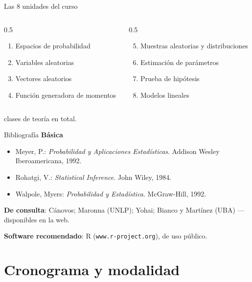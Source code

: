 \documentclass[aspectratio=169,11pt]{beamer}
\begin{document}
\begin{frame}{Las 8 unidades del curso}
\begin{columns}[T]
\begin{column}{0.5\textwidth}
\begin{enumerate}
\item Espacios de probabilidad
\item Variables aleatorias
\item Vectores aleatorios
\item Función generadora de momentos
\end{enumerate}
\end{column}
\begin{column}{0.5\textwidth}
\begin{enumerate}
\setcounter{enumi}{4}
\item Muestras aleatorias y distribuciones
\item Estimación de parámetros
\item Prueba de hipótesis
\item Modelos lineales
\end{enumerate}
\end{column}
\end{columns}
\vspace{1em}
 clases de teoría en total.
\end{frame}

\begin{frame}{Bibliografía}
\textbf{Básica}
\begin{itemize}
\item Meyer, P.: \emph{Probabilidad y Aplicaciones Estadísticas}. Addison Wesley Iberoamericana, 1992.
\item Rohatgi, V.: \emph{Statistical Inference}. John Wiley, 1984.
\item Walpole, Myers: \emph{Probabilidad y Estadística}. McGraw-Hill, 1992.
\end{itemize}
\textbf{De consulta}: Cánovos; Maronna (UNLP); Yohai; Bianco y Martínez (UBA) — disponibles en la web.
\vspace{0.5em}

\textbf{Software recomendado}: R (\texttt{www.r-project.org}), de uso público.
\end{frame}

\section{Cronograma y modalidad}
\end{document}

